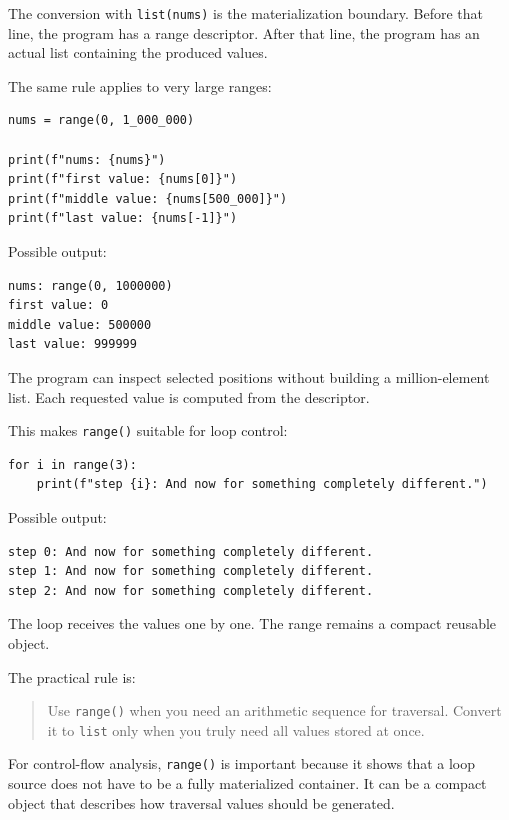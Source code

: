 \documentclass[a4paper,twoside]{report}
\begin{document}
The conversion with \texttt{list(nums)} is the materialization boundary. Before that line, the program has a range descriptor. After that line, the program has an actual list containing the produced values.

The same rule applies to very large ranges:

\begin{verbatim}
nums = range(0, 1_000_000)

print(f"nums: {nums}")
print(f"first value: {nums[0]}")
print(f"middle value: {nums[500_000]}")
print(f"last value: {nums[-1]}")
\end{verbatim}

Possible output:

\begin{verbatim}
nums: range(0, 1000000)
first value: 0
middle value: 500000
last value: 999999
\end{verbatim}

The program can inspect selected positions without building a million-element list. Each requested value is computed from the descriptor.

This makes \texttt{range()} suitable for loop control:

\begin{verbatim}
for i in range(3):
    print(f"step {i}: And now for something completely different.")
\end{verbatim}

Possible output:

\begin{verbatim}
step 0: And now for something completely different.
step 1: And now for something completely different.
step 2: And now for something completely different.
\end{verbatim}

The loop receives the values one by one. The range remains a compact reusable object.

The practical rule is:

\begin{quote}
Use \texttt{range()} when you need an arithmetic sequence for traversal. Convert it to \texttt{list} only when you truly need all values stored at once.
\end{quote}

For control-flow analysis, \texttt{range()} is important because it shows that a loop source does not have to be a fully materialized container. It can be a compact object that describes how traversal values should be generated.
\end{document}
